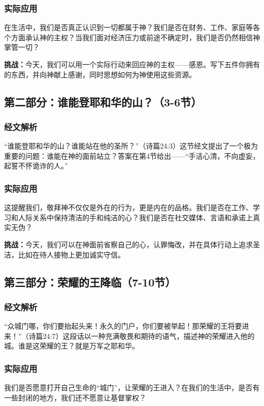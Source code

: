 \documentclass[a4paper, 12pt]{article}
\begin{document}
\subsubsection*{实际应用}
在生活中，我们是否真正认识到一切都属于神？我们是否在财务、工作、家庭等各个方面承认神的主权？当我们面对经济压力或前途不确定时，我们是否仍然相信神掌管一切？

\textbf{挑战：}今天，我们可以用一个实际行动来回应神的主权——感恩。写下五件你拥有的东西，并向神献上感谢，同时思想如何为神使用这些资源。

\subsection*{第二部分：谁能登耶和华的山？（3-6节）}
\subsubsection*{经文解析}
“谁能登耶和华的山？谁能站在他的圣所？”（诗篇24:3）这节经文提出了一个极为重要的问题：谁能在神的面前站立？答案在第4节给出——“手洁心清，不向虚妄，起誓不怀诡诈的人。”

\subsubsection*{实际应用}
这提醒我们，敬拜神不仅仅是外在的行为，更是内在的品格。我们是否在工作、学习和人际关系中保持清洁的手和纯洁的心？我们是否在社交媒体、言语和承诺上真实无伪？

\textbf{挑战：}今天，我们可以在神面前省察自己的心，认罪悔改，并在具体行动上追求圣洁，比如在待人接物上更加诚实守信。

\subsection*{第三部分：荣耀的王降临（7-10节）}
\subsubsection*{经文解析}
“众城门哪，你们要抬起头来！永久的门户，你们要被举起！那荣耀的王将要进来！”（诗篇24:7）这段话以一种充满敬畏和期待的语气，描述神的荣耀进入他的城。谁是这荣耀的王？就是万军之耶和华。

\subsubsection*{实际应用}
我们是否愿意打开自己生命的“城门”，让荣耀的王进入？在我们的生活中，是否有一些封闭的地方，我们还不愿意让基督掌权？
\end{document}
